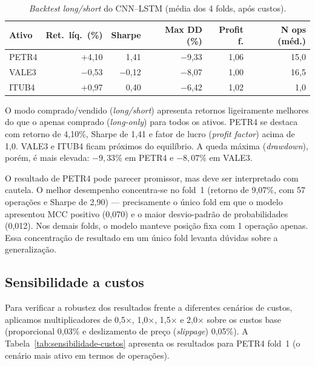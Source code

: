 \begin{table}[htbp]
  \centering
  \caption{\textit{Backtest} \textit{long/short} do CNN--LSTM (média dos 4 folds, após custos).}
  \label{tab:backtest-longshort}
  \begin{tabular}{l r r r r r}
    \toprule
    \textbf{Ativo} & \textbf{Ret.\ líq.\ (\%)} & \textbf{Sharpe} & \textbf{Max DD (\%)} & \textbf{Profit f.} & \textbf{N ops (méd.)} \\
    \midrule
    PETR4 & $+$4,10 & 1,41 & $-$9,33 & 1,06 & 15,0 \\
    VALE3 & $-$0,53 & $-$0,12 & $-$8,07 & 1,00 & 16,5 \\
    ITUB4 & $+$0,97 & 0,40 & $-$6,42 & 1,02 & 1,0 \\
    \bottomrule
  \end{tabular}
\end{table}

O modo comprado/vendido (\textit{long/short}) apresenta retornos ligeiramente melhores do que o apenas comprado (\textit{long-only})
para todos os ativos. PETR4 se destaca com retorno de 4,10\%, Sharpe de 1,41 e
fator de lucro (\textit{profit factor}) acima de 1,0. VALE3 e ITUB4 ficam próximos do equilíbrio.
A queda máxima (\textit{drawdown}), porém, é mais elevada: $-9{,}33$\% em PETR4 e $-8{,}07$\% em VALE3.

O resultado de PETR4 pode parecer promissor, mas deve ser interpretado com cautela.
O melhor desempenho concentra-se no fold~1 (retorno de 9,07\%, com 57 operações e Sharpe de 2,90)
--- precisamente o único fold em que o modelo apresentou MCC positivo (0,070) e o maior
desvio-padrão de probabilidades (0,012). Nos demais folds, o modelo manteve posição fixa
com 1 operação apenas. Essa concentração de resultado em um único fold levanta dúvidas sobre
a generalização.

\subsection{Sensibilidade a custos}

Para verificar a robustez dos resultados frente a diferentes cenários de custos,
aplicamos multiplicadores de 0,5$\times$, 1,0$\times$, 1,5$\times$ e 2,0$\times$ sobre os custos base
(proporcional 0,03\% e deslizamento de preço (\textit{slippage}) 0,05\%).
A Tabela~\ref{tab:sensibilidade-custos} apresenta os resultados para PETR4 fold~1
(o cenário mais ativo em termos de operações).

